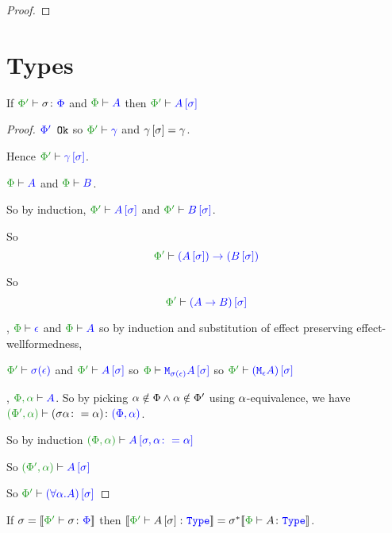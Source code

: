 \documentclass{report}
\begin{document}
\begin{framed}
\begin{proof}
    \end{proof}
    
\end{framed}\section{Types}

\begin{theorem}
    If $\typerelation{\P'}{\si}{\P}$ and $\wellformed{\P}{A}$ then $\wellformed{\P'}{A\ssi}$
\end{theorem}


\begin{framed}    
    \begin{proof}
        
        ${\color{blue} \Phi'} \texttt{ Ok}$ so $\wellformed{\P'}{\g}$ and $\gamma\left[\sigma\right]=\gamma$.
        
        Hence $\wellformed{\P'}{\g\ssi}$.
        
        
        \bi $\wellformed{\P}{A}$ and $\wellformed{\P}{B}$.
        
        So by induction, $\wellformed{\P'}{A\ssi}$ and $\wellformed{\P'}{B\ssi}$.
        
        So \begin{equation}
            \wellformed{\P'}{\fntype{(A\ssi)}{(B\ssi)}}
        \end{equation}
        
        So \begin{equation}
            \wellformed{\P'}{(\ab)\ssi}
        \end{equation}
        
        
        
        
        \bi, $\wellformed{\P}{\e}$ and $\wellformed{\P}{A}$ so by induction and substitution of effect preserving effect-wellformedness, 
        
        $\wellformed{\P'}{\si(\e)}$ and $\wellformed{\P'}{A\ssi}$ so $\wellformed{\P}{\M{\si(\e)}{A\ssi}}$ so $\wellformed{\P'}{(\mea)\ssi}$
        
        \bi, $\wellformed{\P,\a}{A}$. So by picking $\alpha\notin\Phi\wedge\alpha\notin\Phi'$ using $\alpha$-equivalence, we have $\typerelation{(\P',\a)}{(\si\a\setto\a)}{(\P,\a)}$.
        
        So by induction $\wellformed{(\P, \a)}{A\sub{\si,\a\setto\a}}$
        
        So $\wellformed{(\P',\a)}{A\ssi}$
        
        So $\wellformed{\P'}{(\all{\a}{A})\ssi}$
        
    \end{proof}
    
\end{framed}\begin{theorem}
    If $\si = \deno{\typerelation{\P'}{\si}{\P}}$ then $\deno{\typerelation{\P'}{A\ssi}{\type}} = \si\star\deno{\typerelation{\P}{A}{\type}}$.
\end{theorem}
\end{document}

